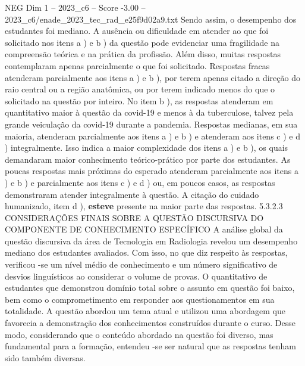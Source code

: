 \begin{textsample}{NEG Dim 1 – 2023\_c6 – Score -3.00 – 2023\_c6/enade\_2023\_tec\_rad\_e25f9d02a9.txt}
Sendo assim, o desempenho dos estudantes foi mediano.
A ausência ou dificuldade em atender ao que foi solicitado nos itens a ) e b ) da questão pode evidenciar uma fragilidade na compreensão teórica e na prática da profissão.
Além disso, muitas respostas contemplaram apenas parcialmente o que foi solicitado.
Respostas fracas atenderam parcialmente aos itens a ) e b ), por terem apenas citado a direção do raio central ou a região anatômica, ou por terem indicado menos do que o solicitado na questão por inteiro.
No item b ), as respostas atenderam em quantitativo maior à questão da covid-19 e menos à da tuberculose, talvez pela grande veiculação da covid-19 durante a pandemia.
Respostas medianas, em sua maioria, atenderam parcialmente aos itens a ) e b ) e atenderam aos itens c ) e d ) integralmente.
Isso indica a maior complexidade dos itens a ) e b ), os quais demandaram maior conhecimento teórico-prático por parte dos estudantes.
As poucas respostas mais próximas do esperado atenderam parcialmente aos itens a ) e b ) e parcialmente aos itens c ) e d ) ou, em poucos casos, as respostas demonstraram atender integralmente à questão.
A citação do cuidado humanizado, item d ), \textbf{esteve} presente na maior parte das respostas. 5.3.2.3 CONSIDERAÇÕES FINAIS SOBRE A QUESTÃO DISCURSIVA DO COMPONENTE DE CONHECIMENTO ESPECÍFICO A análise global da questão discursiva da área de Tecnologia em Radiologia revelou um desempenho mediano dos estudantes avaliados.
Com isso, no que diz respeito às respostas, verificou -se um nível médio de conhecimento e um número significativo de desvios linguísticos ao considerar o volume de provas.
O quantitativo de estudantes que demonstrou domínio total sobre o assunto em questão foi baixo, bem como o comprometimento em responder aos questionamentos em sua totalidade.
A questão abordou um tema atual e utilizou uma abordagem que favorecia a demonstração dos conhecimentos construídos durante o curso.
Desse modo, considerando que o conteúdo abordado na questão foi diverso, mas fundamental para a formação, entendeu -se ser natural que as respostas tenham sido também diversas.

\end{textsample}
